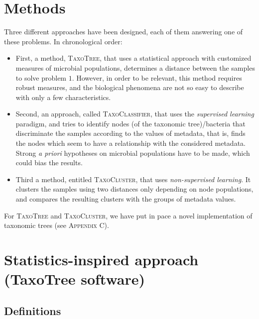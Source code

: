 \documentclass{report}
\begin{document}
\newpage

\chapter*{Methods}

Three different approaches have been designed, each of them answering one of these problems. In chronological order:
\begin{itemize}
\item First, a method, \textsc{TaxoTree}, that uses a statistical approach with customized measures of microbial populations, determines a distance between the samples to solve problem $1$. However, in order to be relevant, this method requires robust measures, and the biological phenomena are not so easy to describe with only a few characteristics.
\item Second, an approach, called \textsc{TaxoClassifier}, that uses the \emph{supervised learning} paradigm, and tries to identify nodes (of the taxonomic tree)/bacteria that discriminate the samples according to the values of metadata, that is, finds the nodes which seem to have a relationship with the considered metadata. Strong \emph{a priori} hypotheses on microbial populations have to be made, which could bias the results.
\item Third a method, entitled \textsc{TaxoCluster}, that uses \emph{non-supervised learning}. It clusters the samples using two distances only depending on node populations, and compares the resulting clusters with the groups of metadata values.
\end{itemize}

For \textsc{TaxoTree} and \textsc{TaxoCluster}, we have put in pace a novel implementation of taxonomic trees (see \textsc{Appendix C}).

\chapter{Statistics-inspired approach (TaxoTree software)}

\section{Definitions}
\end{document}
